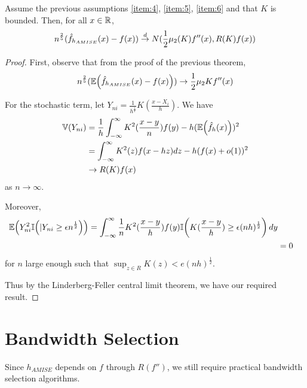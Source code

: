 \begin{thm}
  \label{defn:Introduction:4}
  Assume the previous assumptions \ref{item:4}, \ref{item:5},
  \ref{item:6} and that $K$ is bounded.  Then, for all $x \in \mathbb{R}$,
  \begin{equation}
    \label{eq:26}
    n^{\frac{2}{5}}(\hat f_{h_{AMISE}}(x) - f(x)) \overset{d}{\rightarrow}
    N(\frac{1}{2}\mu_{2}(K) f''(x), R(K) f(x))
  \end{equation}
\end{thm}

\begin{proof}
  First, observe that from the proof of the previous theorem,
  \begin{align}
    \label{eq:27}
    n^{\frac{2}{5}} (\E{\hat f_{h_{AMISE}}(x) - f(x)}) \rightarrow
    \frac{1}{2} \mu_{2} K f''(x)
  \end{align}

  For the stochastic term, let $Y_{ni} = \frac{1}{h^{\frac{1}{2}}}
  K(\frac{x - X_{i}}{h})$.  We have
  \begin{align}
    \label{eq:28}
    \Var{Y_{ni}} &= \frac{1}{h} \int_{-\infty}^{\infty}
    K^{2}(\frac{x-y}{n}) f(y) - h(\E{\hat f_{h}(x)})^{2} \\
    &= \int_{-\infty}^{\infty} K^{2}(z) f(x - hz) dz - h(f(x) +
    o(1))^{2} \\
    &\rightarrow R(K) f(x)
  \end{align} as $n \rightarrow \infty$.

  Moreover,
  \begin{align}
    \label{eq:29}
    \E{Y^{2}_{ni} \I{|Y_{ni} \geq \epsilon n^{\frac{1}{2}}}} =
    \int_{-\infty}^{\infty} \frac{1}{n} K^{2}(\frac{x - y}{h}) f(y)
    \I{K(\frac{x - y}{h}) \geq \epsilon (nh)^{\frac{1}{2}}} dy \\
    &= 0
  \end{align} for $n$ large enough such that $\sup_{z \in R} K(z) < e
  (nh)^\frac{1}{2}$.

  Thus by the Linderberg-Feller central limit theorem, we have our
  required result.
\end{proof}

\section{Bandwidth Selection}
\label{sec:bandwidth-selection}

Since $h_{AMISE}$ depends on $f$ through $R(f'')$, we still require
practical bandwidth selection algorithms.

